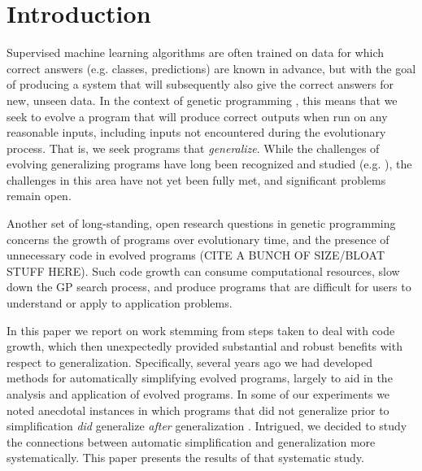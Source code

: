 \section{Introduction}
\label{sec:intro}

Supervised machine learning algorithms are often trained on data for which correct answers (e.g. classes, predictions) are known in advance, but with the goal of producing a system that will subsequently also give the correct answers for new, unseen data. In the context of genetic programming \cite{koza:book}, this means that we seek to evolve a program that will produce correct outputs when run on any reasonable inputs, including inputs not encountered during the evolutionary process. That is, we seek programs that {\it generalize}. While the challenges of evolving generalizing programs have long been recognized and studied (e.g. \cite{1144159,DBLP:conf/gecco/VanneschiG09,Castelli:2010:cec,Goncalves:2015:EuroGP}), the challenges in this area have not yet been fully met, and significant  problems remain open.

Another set of long-standing, open research questions in genetic programming concerns the growth of programs over evolutionary time, and the presence of unnecessary code in evolved programs (CITE A BUNCH OF SIZE/BLOAT STUFF HERE). Such code growth can consume computational resources, slow down the GP search process, and produce programs that are difficult for users to understand or apply to application problems. 

In this paper we report on work stemming from steps taken to deal with code growth, which then unexpectedly provided substantial and robust benefits with respect to generalization. Specifically, several years ago we had developed methods for automatically simplifying evolved programs, largely to aid in the analysis and application of evolved programs. In some of our experiments we noted anecdotal instances in which programs that did not generalize prior to simplification {\it did} generalize {\it after} generalization \cite{Helmuth:2015:dissertation}. Intrigued, we decided to study the connections between automatic simplification and generalization more systematically. This paper presents the results of that systematic study.


